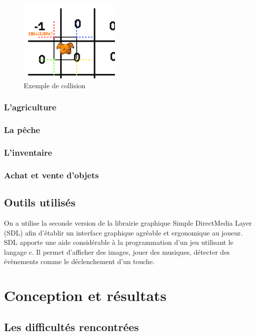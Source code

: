 \documentclass{article}
\begin{document}
        \begin{figure}[h]  
            \includegraphics[height = 4cm]{exermple_collision.png}
            \centering
            \caption{Exemple de collision}
            \label{fig:collions}
        \end{figure}
        
        \subsubsection{L'agriculture}
        
        \subsubsection{La pêche}
        
        \subsubsection{L'inventaire}
        
        \subsubsection{Achat et vente d'objets}
    
    \subsection{Outils utilisés}
    On a utilise la seconde version de la librairie graphique Simple DirectMedia Layer (SDL) afin d’établir un interface graphique agréable et ergonomique au joueur. SDL apporte une aide considérable à la programmation d’un jeu utilisant le langage c. Il permet d’afficher des images, jouer des musiques, détecter des évènements comme le déclenchement d’un touche. 
\section{Conception et résultats}
    \subsection{Les difficultés rencontrées}
\end{document}
